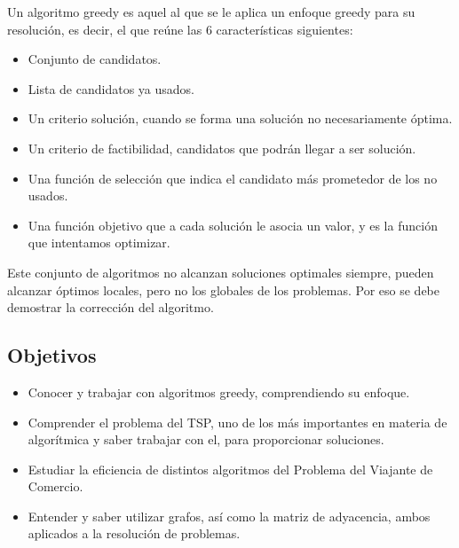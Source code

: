 Un algoritmo greedy es aquel al que se le aplica un enfoque greedy para su resolución, es decir, el que reúne las 6 características siguientes:
\begin{itemize}
    \item Conjunto de candidatos.
    \item Lista de candidatos ya usados.
    \item Un criterio solución, cuando se forma una solución no necesariamente óptima.
    \item Un criterio de factibilidad, candidatos que podrán llegar a ser solución.
    \item Una función de selección que indica el candidato más prometedor de los no usados.
    \item Una función objetivo que a cada solución le asocia un valor, y es la función que intentamos optimizar.
\end{itemize}

Este conjunto de algoritmos no alcanzan soluciones optimales siempre, pueden alcanzar óptimos locales, pero no los globales de los problemas.
Por eso se debe demostrar la corrección del algoritmo.

\subsection{Objetivos}
\begin{itemize}
    \item Conocer y trabajar con algoritmos greedy, comprendiendo su enfoque.
    \item Comprender el problema del TSP, uno de los más importantes en materia de algorítmica y saber trabajar con el, para proporcionar soluciones.
    \item Estudiar la eficiencia de distintos algoritmos del Problema del Viajante de Comercio.
    \item Entender y saber utilizar grafos, así como la matriz de adyacencia, ambos aplicados a la resolución de problemas.
\end{itemize}